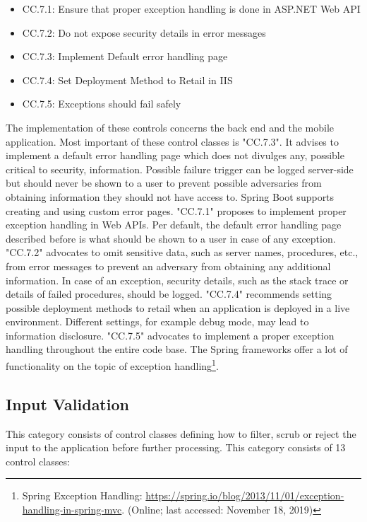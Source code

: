 \begin{itemize}
    \item CC.7.1: Ensure that proper exception handling is done in ASP.NET Web API
    \item CC.7.2: Do not expose security details in error messages
    \item CC.7.3: Implement Default error handling page
    \item CC.7.4: Set Deployment Method to Retail in IIS
    \item CC.7.5: Exceptions should fail safely
\end{itemize}

The implementation of these controls concerns the back end and the mobile application. Most important of these control classes is "CC.7.3". It advises to implement a default error handling page which does not divulges any, possible critical to security, information. Possible failure trigger can be logged server-side but should never be shown to a user to prevent possible adversaries from obtaining information they should not have access to. Spring Boot supports creating and using custom error pages. "CC.7.1" proposes to implement proper exception handling in Web APIs. Per default, the default error handling page described before is what should be shown to a user in case of any exception. "CC.7.2" advocates to omit sensitive data, such as server names, procedures, etc., from error messages to prevent an adversary from obtaining any additional information. In case of an exception, security details, such as the stack trace or details of failed procedures, should be logged. "CC.7.4" recommends setting possible deployment methods to retail when an application is deployed in a live environment. Different settings, for example debug mode, may lead to information disclosure. "CC.7.5" advocates to implement a proper exception handling throughout the entire code base. The Spring frameworks offer a lot of functionality on the topic of exception handling\footnote{Spring Exception Handling: \url{https://spring.io/blog/2013/11/01/exception-handling-in-spring-mvc}. (Online; last accessed:  November 18, 2019)}.

\subsection{Input Validation}
This category consists of control classes defining how to filter, scrub or reject the input to the application before further processing. This category consists of 13 control classes:


